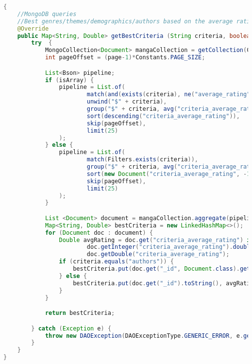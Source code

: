 \begin{mdframed}[backgroundcolor=yellow!20, innerleftmargin=10pt, innerrightmargin=10pt]
    \begin{lstlisting}[language=java]
{
    //MongoDB queries
    //Best genres/themes/demographics/authors based on the average rating
    @Override
    public Map<String, Double> getBestCriteria (String criteria, boolean isArray, int page) throws DAOException {
        try  {
            MongoCollection<Document> mangaCollection = getCollection(COLLECTION_NAME);
            int pageOffset = (page-1)*Constants.PAGE_SIZE;

            List<Bson> pipeline;
            if (isArray) {
                pipeline = List.of(
                        match(and(exists(criteria), ne("average_rating", null))),
                        unwind("$" + criteria),
                        group("$" + criteria, avg("criteria_average_rating", "$average_rating")),
                        sort(descending("criteria_average_rating")),
                        skip(pageOffset),
                        limit(25)
                );
            } else {
                pipeline = List.of(
                        match(Filters.exists(criteria)),
                        group("$" + criteria, avg("criteria_average_rating", "$average_rating")),
                        sort(new Document("criteria_average_rating", -1)),
                        skip(pageOffset),
                        limit(25)
                );
            }

            List <Document> document = mangaCollection.aggregate(pipeline).into(new ArrayList<>());
            Map<String, Double> bestCriteria = new LinkedHashMap<>();
            for (Document doc : document) {
                Double avgRating = doc.get("criteria_average_rating") instanceof Integer?
                        doc.getInteger("criteria_average_rating").doubleValue() :
                        doc.getDouble("criteria_average_rating");
                if (criteria.equals("authors")) {
                    bestCriteria.put(doc.get("_id", Document.class).getString("name"), avgRating);
                } else {
                    bestCriteria.put(doc.get("_id").toString(), avgRating);
                }
            }

            return bestCriteria;

        } catch (Exception e) {
            throw new DAOException(DAOExceptionType.GENERIC_ERROR, e.getMessage());
        }
    }
}
    \end{lstlisting}
\end{mdframed}



